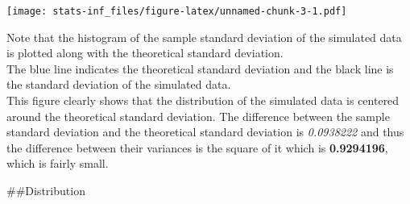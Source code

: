 \documentclass[
]{article}
\newenvironment{Shaded}{\begin{snugshade}}{\end{snugshade}}
\newcommand{\DataTypeTok}[1]{\textcolor[rgb]{0.13,0.29,0.53}{#1}}
\newcommand{\DecValTok}[1]{\textcolor[rgb]{0.00,0.00,0.81}{#1}}
\newcommand{\FloatTok}[1]{\textcolor[rgb]{0.00,0.00,0.81}{#1}}
\newcommand{\KeywordTok}[1]{\textcolor[rgb]{0.13,0.29,0.53}{\textbf{#1}}}
\newcommand{\NormalTok}[1]{#1}
\newcommand{\OperatorTok}[1]{\textcolor[rgb]{0.81,0.36,0.00}{\textbf{#1}}}
\newcommand{\StringTok}[1]{\textcolor[rgb]{0.31,0.60,0.02}{#1}}
\begin{document}
\begin{Shaded}
\end{Shaded}

\texttt{[image: stats-inf\_files/figure-latex/unnamed-chunk-3-1.pdf]}

Note that the histogram of the sample standard deviation of the
simulated data is plotted along with the theoretical standard
deviation.\\
The blue line indicates the theoretical standard deviation and the black
line is the standard deviation of the simulated data.\\
This figure clearly shows that the distribution of the simulated data is
centered around the theoretical standard deviation. The difference
between the sample standard deviation and the theoretical standard
deviation is \emph{0.0938222} and thus the difference between their
variances is the square of it which is \textbf{0.9294196}, which is
fairly small.

\#\#Distribution
\end{document}
